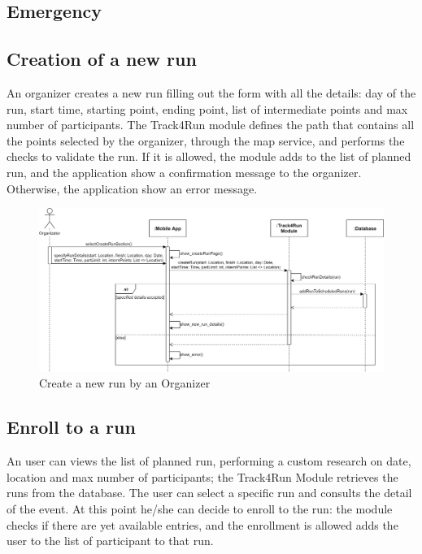 \subsection{Emergency }

\subsection{Creation of a new run}
An organizer creates a new run filling out the form with all the details: day of the run, start time, starting point, ending point, list of intermediate points and max number of participants. The Track4Run module defines the path that contains all the points selected by the organizer, through the map service, and performs the checks to validate the run. If it is allowed, the module adds to the list of planned run, and the application show a confirmation message to the organizer. Otherwise, the application show an error message.

\begin{figure}[H]
    \centering
    \includegraphics[scale=0.16]{DD/Pictures/createRunSeqDiagDD.png}
    \caption{Create a new run by an Organizer}
\end{figure}

\subsection{Enroll to a run}
An user can views the list of planned run, performing a custom research on date, location and max number of participants; the Track4Run Module retrieves the runs from the database. The user can select a specific run and consults the detail of the event. At this point he/she can decide to enroll to the run: the module checks if there are yet available entries, and the enrollment is allowed adds the user to the list of participant to that run.

